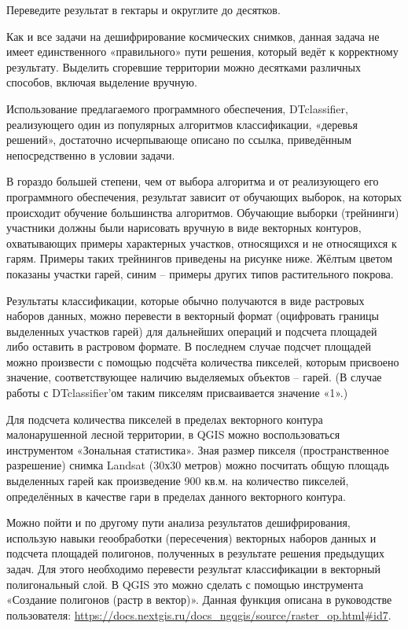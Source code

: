 Переведите результат в гектары и округлите до десятков.

\explanationSection

Как и все задачи на дешифрирование космических снимков, данная задача не имеет единственного «правильного» пути решения, который ведёт к корректному результату. Выделить сгоревшие территории можно десятками различных способов, включая выделение вручную.

Использование предлагаемого программного обеспечения, DTclassifier, реализующего один из популярных алгоритмов классификации, «деревья решений», достаточно исчерпывающе описано по ссылка, приведённым непосредственно в условии задачи.

В гораздо большей степени, чем от выбора алгоритма и от реализующего его программного обеспечения, результат зависит от обучающих выборок, на которых происходит обучение большинства алгоритмов. Обучающие выборки (трейнинги) участники должны были нарисовать вручную в виде векторных контуров, охватывающих примеры характерных участков, относящихся и не относящихся к гарям. Примеры таких трейнингов приведены на рисунке ниже. Жёлтым цветом показаны участки гарей, синим – примеры других типов растительного покрова.


Результаты классификации, которые обычно получаются в виде растровых наборов данных, можно перевести в векторный формат (оцифровать границы выделенных участков гарей) для дальнейших операций и подсчета площадей либо оставить в растровом формате. В последнем случае подсчет площадей можно произвести с помощью подсчёта количества пикселей, которым присвоено значение, соответствующее наличию выделяемых объектов – гарей. (В случае работы с DTclassifier’ом таким пикселям присваивается значение «1».)

Для подсчета количества пикселей в пределах векторного контура малонарушенной лесной территории, в QGIS можно воспользоваться инструментом «Зональная статистика». Зная размер пикселя (пространственное разрешение) снимка Landsat (30х30 метров) можно посчитать общую площадь выделенных гарей как произведение 900 кв.м. на количество пикселей, определённых в качестве гари в пределах данного векторного контура.

Можно пойти и по другому пути анализа результатов дешифрирования, использую навыки геообработки (пересечения) векторных наборов данных и подсчета площадей полигонов, полученных в результате решения предыдущих задач. Для этого необходимо перевести результат классификации в векторный полигональный слой. В QGIS это можно сделать с помощью инструмента «Создание полигонов (растр в вектор)». Данная функция описана в руководстве пользователя: \url{https://docs.nextgis.ru/docs_ngqgis/source/raster_op.html#id7}.

